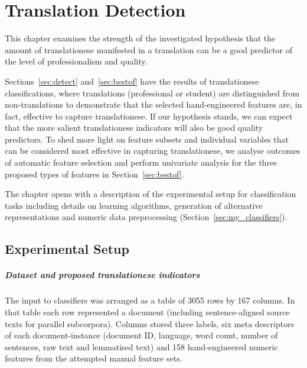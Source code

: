 \chapter{\label{cha:translationese}Translation Detection}
This chapter examines the strength of the investigated hypothesis that the amount of translationese manifested in a translation can be a good predictor of the level of professionalism and quality. 

Sections~\ref{sec:detect} and~\ref{sec:bestof} have the results of translationese classifications, where translations (professional or student) are distinguished from non-translations to demonstrate that the selected hand-engineered features are, in fact, effective to capture translationese. 
If our hypothesis stands, we can expect that the more salient translationese indicators will also be good quality predictors. 
To shed more light on feature subsets and individual variables that can be considered most effective in capturing translationese, we analyse outcomes of automatic feature selection and perform univariate analysis for the three proposed types of features in Section~\ref{sec:bestof}.

The chapter opens with a description of the experimental setup for classification tasks including details on learning algorithms, generation of alternative representations and numeric data preprocessing (Section~\ref{sec:my_classifiers}).

\section{\label{sec:my_classifiers}Experimental Setup}

\paragraph{Dataset and proposed translationese indicators} The input to classifiers was arranged as a table of 3055 rows by 167 columns. In that table each row represented a document (including sentence-aligned source texts for parallel subcorpora). Columns stored three labels, six meta descriptors of each document-instance (document ID, language, word count, number of sentences, raw text and lemmatised text) and 158 hand-engineered numeric features from the attempted manual feature sets. 

